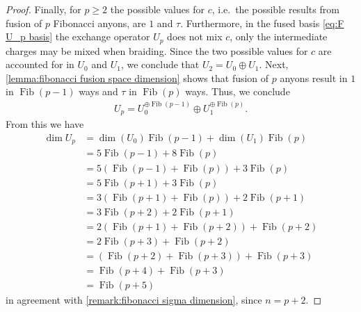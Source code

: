 \documentclass[a4paper,10pt,oneside]{book}
\theoremstyle{plain}
\theoremstyle{definition}
\theoremstyle{remark}
\DeclareMathOperator{\Fib}{Fib}
\begin{document}
\begin{proof}
  Finally, for $p \ge 2$ the possible values for $c$, i.e.\ the possible results from fusion of $p$ Fibonacci anyons, are $1$ and $τ$. Furthermore, in the fused basis \cref{eq:F U_p basis} the exchange operator $U_p$ does not mix $c$, only the intermediate charges may be mixed when braiding. Since the two possible values for $c$ are accounted for in $U_0$ and $U_1$, we conclude that $U_2 = U_0 \oplus U_1$. Next, \cref{lemma:fibonacci fusion space dimension} shows that fusion of $p$ anyons result in $1$ in $\Fib(p-1)$ ways and $τ$ in $\Fib(p)$ ways. Thus, we conclude
  \begin{align*}
    U_p = U_0^{\oplus\Fib(p-1)} \oplus U_1^{\oplus\Fib(p)}.
  \end{align*}
  From this we have
  \begin{align*}
    \dim U_p
    &= \dim(U_0) \Fib(p-1) + \dim(U_1) \Fib(p) \\
    &= 5 \Fib(p-1) + 8 \Fib(p) \\
    &= 5 \left(\Fib(p-1) + \Fib(p) \right) + 3 \Fib(p) \\
    &= 5 \Fib(p+1) + 3 \Fib(p) \\
    &= 3 \left(\Fib(p+1)+\Fib(p)\right) + 2 \Fib(p+1) \\
    &= 3 \Fib(p+2) + 2 \Fib(p+1) \\
    &= 2 \left(\Fib(p+1)+\Fib(p+2)\right) + \Fib(p+2) \\
    &= 2 \Fib(p+3) + \Fib(p+2) \\
    &=   \left(\Fib(p+2) + \Fib(p+3)\right) + \Fib(p+3) \\
    &=   \Fib(p+4) + \Fib(p+3) \\
    &=   \Fib(p+5)
  \end{align*}
  in agreement with \cref{remark:fibonacci sigma dimension}, since $n = p + 2$.


\end{proof}
\end{document}
